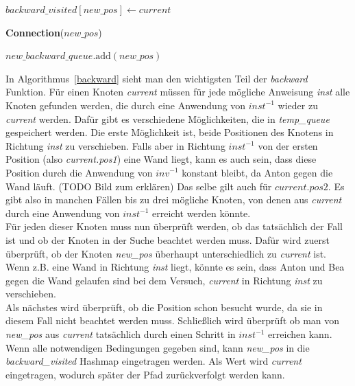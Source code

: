 \documentclass[a4paper,10pt,ngerman]{scrartcl}
\begin{document}
\begin{algorithm}[H]
\begin{algorithmic}[1]
                        \State $\textit{backward\_visited}[\textit{new\_pos}] \gets \textit{current}$

                            \State \Return \textbf{Connection}($\textit{new\_pos}$)
                        \EndIf

                        \State $\textit{new\_backward\_queue}.\text{add}(\textit{new\_pos})$
                    \EndFor
                \EndFor
            \EndFunction
        \end{algorithmic}
    \end{algorithm}
    In Algorithmus~\ref{backward} sieht man den wichtigsten Teil der \textit{backward} Funktion. Für einen Knoten \textit{current} müssen für jede mögliche Anweisung \textit{inst} alle Knoten gefunden werden, die durch eine Anwendung von $\textit{inst}^{-1}$ wieder zu \textit{current} werden. Dafür gibt es verschiedene Möglichkeiten, die in \textit{temp\_queue} gespeichert werden. Die erste Möglichkeit ist, beide Positionen des Knotens in Richtung \textit{inst} zu verschieben. Falls aber in Richtung $\textit{inst}^{-1}$ von der ersten Position (also \textit{current.pos1}) eine Wand liegt, kann es auch sein, dass diese Position durch die Anwendung von $\textit{inv}^{-1}$ konstant bleibt, da Anton gegen die Wand läuft. (TODO Bild zum erklären) Das selbe gilt auch für $\textit{current.pos2}$. Es gibt also in manchen Fällen bis zu drei mögliche Knoten, von denen aus \textit{current} durch eine Anwendung von $\textit{inst}^{-1}$ erreicht werden könnte. \\
    Für jeden dieser Knoten muss nun überprüft werden, ob das tatsächlich der Fall ist und ob der Knoten in der Suche beachtet werden muss. Dafür wird zuerst überprüft, ob der Knoten \textit{new\_pos} überhaupt unterschiedlich zu \textit{current} ist. Wenn z.B. eine Wand in Richtung \textit{inst} liegt, könnte es sein, dass Anton und Bea gegen die Wand gelaufen sind bei dem Versuch, \textit{current} in Richtung \textit{inst} zu verschieben. \\
    Als nächstes wird überprüft, ob die Position schon besucht wurde, da sie in diesem Fall nicht beachtet werden muss. Schließlich wird überprüft ob man von \textit{new\_pos} aus \textit{current} tatsächlich durch einen Schritt in $\textit{inst}^{-1}$ erreichen kann.\\
    Wenn alle notwendigen Bedingungen gegeben sind, kann \textit{new\_pos} in die \textit{backward\_visited} Hashmap eingetragen werden. Als Wert wird \textit{current} eingetragen, wodurch später der Pfad zurückverfolgt werden kann. \\
\end{document}
